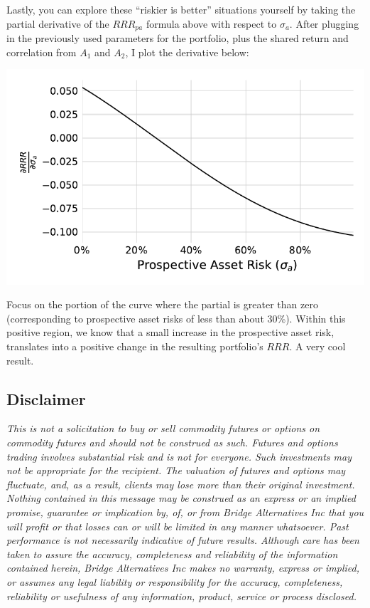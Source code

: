 \documentclass[]{article}
\begin{document}
Lastly, you can explore these ``riskier is better'' situations yourself
by taking the partial derivative of the \(RRR_{pa}\) formula above with
respect to \(\sigma_a\). After plugging in the previously used
parameters for the portfolio, plus the shared return and correlation
from \(A_1\) and \(A_2\), I plot the derivative below:

\begin{center}\includegraphics{paper_files/figure-latex/Partial-1} \end{center}

Focus on the portion of the curve where the partial is greater than zero
(corresponding to prospective asset risks of less than about 30\%).
Within this positive region, we know that a small increase in the
prospective asset risk, translates into a positive change in the
resulting portfolio's \(RRR\). A very cool result.

\hypertarget{disclaimer}{%
\subsection{Disclaimer}\label{disclaimer}}

\emph{This is not a solicitation to buy or sell commodity futures or
options on commodity futures and should not be construed as such.
Futures and options trading involves substantial risk and is not for
everyone. Such investments may not be appropriate for the recipient. The
valuation of futures and options may fluctuate, and, as a result,
clients may lose more than their original investment. Nothing contained
in this message may be construed as an express or an implied promise,
guarantee or implication by, of, or from Bridge Alternatives Inc that
you will profit or that losses can or will be limited in any manner
whatsoever. Past performance is not necessarily indicative of future
results. Although care has been taken to assure the accuracy,
completeness and reliability of the information contained herein, Bridge
Alternatives Inc makes no warranty, express or implied, or assumes any
legal liability or responsibility for the accuracy, completeness,
reliability or usefulness of any information, product, service or
process disclosed.}
\end{document}
